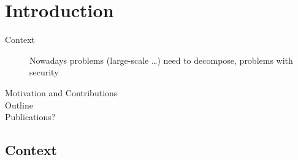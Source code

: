 \documentclass[../main.tex]{subfiles}
\begin{document}
\chapter{Introduction}\label{cha:introduction}
\minitoc

\begin{description}
  \item[Context] Nowadays problems (large-scale \ldots) need to decompose, problems with security
  \item[Motivation and Contributions]
  \item[Outline]
  \item[Publications?]
\end{description}

\section{Context}


\printbibliography
\end{document}
